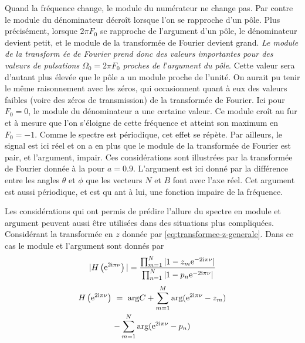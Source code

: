Quand la fr\'{e}quence change, le module du num\'{e}rateur ne change pas. Par contre le module du d\'{e}nominateur d\'{e}cro\^{i}t lorsque l'on se rapproche d'un p\^{o}le. Plus pr\'{e}cis\'{e}ment, lorsque $2\pi F_{0}$ se rapproche de l'argument d'un p\^{o}le, le d\'{e}nominateur devient petit, et le module de la transform\'{e}e de Fourier devient grand. {\it Le module de la transform \'{e}e de Fourier prend donc des valeurs importantes pour des valeurs de pulsations} $\Omega_{0}=2\pi F_{0}$ {\it proches de l}'{\it argument du  p\^{o}le}. Cette
valeur sera d'autant plus \'{e}lev\'{e}e que le p\^{o}le a un module proche de l'unit\'{e}. On aurait pu tenir le m\^{e}me raisonnement avec les z\'{e}ros, qui occasionnent quant \`{a} eux des valeurs faibles (voire des z\'{e}ros de transmission) de la transform\'{e}e de Fourier. Ici pour $F_{0}=0$, le module du d\'{e}nominateur a une certaine valeur. Ce module cro\^{i}t au fur et \`{a} mesure que l'on s'\'{e}loigne de cette fr\'{e}quence et atteint son maximum en $F_{0}=-1$. Comme le spectre est p\'{e}riodique, cet effet se r\'{e}p\`{e}te. Par ailleurs, le signal est ici r\'{e}el et on a en plus que le module de la transform\'{e}e de Fourier est pair, et l'argument, impair. Ces consid\'{e}rations sont illustr\'{e}es par la transform\'{e}e de Fourier donn\'{e}e \`{a} la  pour $a=0.9$. L'argument est ici donn\'{e} par la diff\'{e}rence entre les angles $\theta$ et $\phi$ que les vecteurs $N$ et $B$ font avec l'axe r\'{e}el. Cet argument est aussi p\'{e}riodique, et est qu ant \`{a} lui, une fonction impaire de la fr\'{e}quence.

Les consid\'{e}rations qui ont permis de pr\'{e}dire l'allure du spectre en module et argument peuvent aussi \^{e}tre utilis\'{e}es dans des situations plus compliqu\'{e}es. Consid\'{e}rant la transform\'{e}e en $z$ donn\'{e}e par \eqref{eq:transformee-z-generale}. Dans ce cas le module et l'argument sont donn\'{e}s par
\begin{align*}
|H\left(\mathrm{e}^{2 \mathrm{i} \pi \nu}\right)|= \frac{\prod_{m=1}^N |1 -z_m \mathrm{e}^{-2 \mathrm{i} \pi \nu}|}{\prod_{n=1}^N |1 - p_n \mathrm{e}^{-2 \mathrm{i} \pi \nu}|} \\
\end{align*}
\begin{multline*}
H\left(\mathrm{e}^{2 \mathrm{i} \pi \nu}\right)\ =\ {\rm arg} C+\sum_{m=1}^{M}{\rm arg}(\mathrm{e}^{2 \mathrm{i} \pi \nu}-z_{m}) \\-
\sum_{m=1}^{N}{\rm arg}(\mathrm{e}^{2 \mathrm{i} \pi \nu}-p_{n})
\end{multline*}

